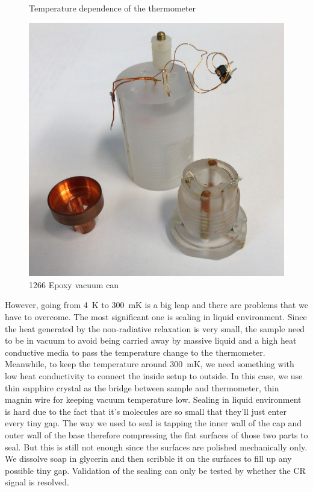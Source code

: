 \documentclass[12pt]{ruthesis}
\begin{document}
\begin{figure}[!htb]
\begin {minipage}{0.3\textwidth}
     \caption{Temperature dependence of the thermometer}\label{r(t)}
   \end{minipage}
   \begin {minipage}{0.3\textwidth}
   	\includegraphics[width=\linewidth]{figures/vacuumcan.JPG}
  	\caption{1266 Epoxy vacuum can}
   \end{minipage}
\end{figure}
 
 
However, going from \SI{4}{\kelvin} to \SI{300}{\milli\kelvin} is a big leap and there are problems that we have to overcome.
The most significant one is sealing in  liquid environment.
Since the heat generated by the non-radiative relaxation is very small, the sample need to be in vacuum to avoid being carried away by massive  liquid and a high heat conductive media to pass the temperature change to the thermometer.
Meanwhile, to keep the temperature around \SI{300}{\milli\kelvin}, we need something with low heat conductivity to connect the inside setup to outside.
In this case, we use thin sapphire crystal as the bridge between sample and thermometer, thin magnin wire for keeping vacuum temperature low.
Sealing in  liquid environment is hard due to the fact that it's molecules are so small that they'll just enter every tiny gap.
The way we used to seal is tapping the inner wall of the cap and outer wall of the base therefore compressing the flat surfaces of those two parts to seal.
But this is still not enough since the surfaces are polished mechanically only.
We dissolve soap in glycerin and then scribble it on the surfaces to fill up any possible tiny gap.
Validation of the sealing can only be tested by whether the CR signal is resolved.
\end{document}
